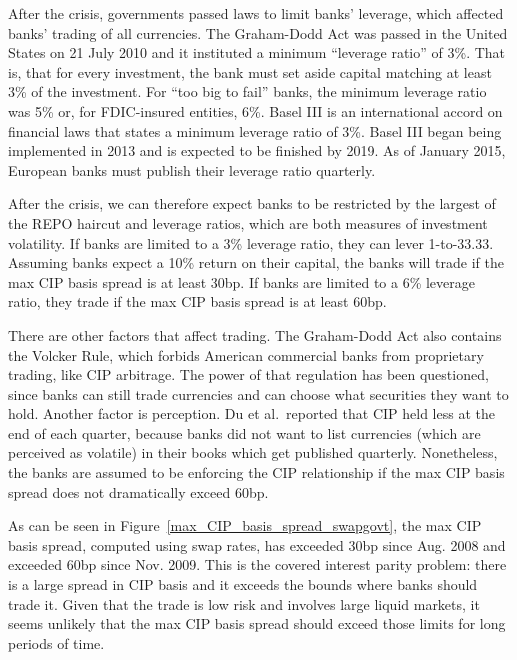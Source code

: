 

After the crisis, governments passed laws to limit banks' leverage, which affected banks' trading of all currencies.  The Graham-Dodd Act was passed in the United States on 21 July 2010 and it instituted a minimum ``leverage ratio'' of 3\%.  That is, that for every investment, the bank must set aside capital matching at least 3\% of the investment.  For ``too big to fail'' banks, the minimum leverage ratio was 5\% or, for FDIC-insured entities, 6\%.  Basel III is an international accord on financial laws that states a minimum leverage ratio of 3\%.  Basel III began being implemented in 2013 and is expected to be finished by 2019.  As of January 2015, European banks must publish their leverage ratio quarterly.  

After the crisis, we can therefore expect banks to be restricted by the largest of the REPO haircut and leverage ratios, which are both measures of investment volatility.  If banks are limited to a 3\% leverage ratio, they can lever 1-to-33.33.  Assuming banks expect a 10\% return on their capital, the banks will trade if the max CIP basis spread is at least 30bp.\cite{Du2017}  If banks are limited to a 6\% leverage ratio, they trade if the max CIP basis spread is at least 60bp.\cite{Rime2017}

There are other factors that affect trading.  The Graham-Dodd Act also contains the Volcker Rule, which forbids American commercial banks from proprietary trading, like CIP arbitrage.  The power of that regulation has been questioned, since banks can still trade currencies and can choose what securities they want to hold.  Another factor is perception.  Du et al.\ reported that CIP held less at the end of each quarter, because banks did not want to list currencies (which are perceived as volatile) in their books which get published quarterly.  Nonetheless, the banks are assumed to be enforcing the CIP relationship if the max CIP basis spread does not dramatically exceed 60bp.

As can be seen in Figure~\ref{max_CIP_basis_spread_swapgovt}, the max CIP basis spread, computed using swap rates, has exceeded 30bp since Aug. 2008 and exceeded 60bp since Nov. 2009.   This is the covered interest parity problem: there is a large spread in CIP basis and it exceeds the bounds where banks should trade it.  Given that the trade is low risk and involves large liquid markets, it seems unlikely that the max CIP basis spread should exceed those limits for long periods of time.  

